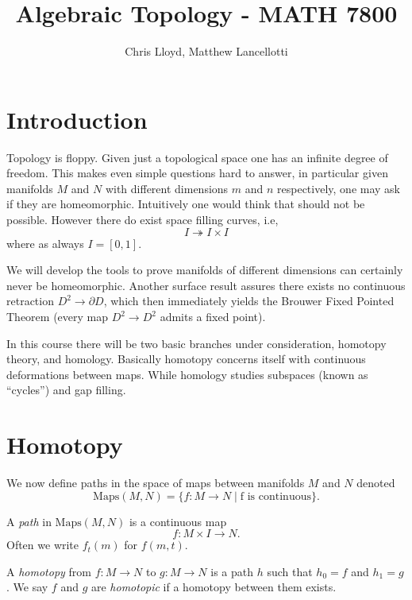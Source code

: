 \documentclass[11pt,leqno,oneside]{amsart}
\title[Algebraic Topology]{Algebraic Topology - MATH 7800}
\author{Chris Lloyd, Matthew Lancellotti}
\date{}
\numberwithin{thm}{section}
\begin{document}
\maketitle \newpage

\section{Introduction}

Topology is floppy. Given just a topological space one has an infinite
degree of freedom. This makes even simple questions hard to answer, in
particular given manifolds \(M\) and \(N\) with different dimensions
\(m\) and \(n\) respectively, one may ask if they are
homeomorphic. Intuitively one would think that should not be
possible. However there do exist space filling curves, i.e,
\[I \twoheadrightarrow I \times I\]
where as always \(I=[0,1]\). 

We will develop the tools to prove manifolds of different dimensions can
certainly never be homeomorphic. Another surface result assures there exists no continuous
retraction \(D^2 \to \partial D\), which then immediately yields the
Brouwer Fixed Pointed Theorem (every map \(D^2 \to D^2\) admits a
fixed point).

In this course there will be two basic branches under consideration,
homotopy theory, and homology. Basically homotopy concerns itself with
continuous deformations between maps. While homology studies subspaces
(known as ``cycles'') and gap filling.

\section{Homotopy}

We now define paths in the space of maps between manifolds \(M\) and
\(N\) denoted
\[\text{Maps}(M,N)=\{f \colon M \to N \mid \text{f is continuous}\}.\]

\begin{defn}
  A \emph{path} in \(\text{Maps}(M,N)\) is a continuous map
  \[f \colon M \times I \to N.\] Often we write \(f_t(m)\) for
  \(f(m,t)\).
\end{defn}

\begin{defn}
  A \emph{homotopy} from \(f \colon M \to N\) to \(g \colon M \to N\)
  is a path \(h\) such that \(h_0=f\) and \(h_1=g\). We say \(f\) and
  \(g\) are \emph{homotopic} if a homotopy between them exists.
\end{defn}
\end{document}
